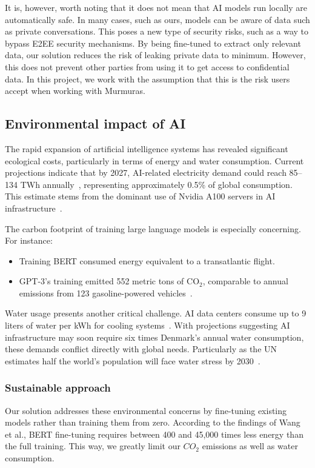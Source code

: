 \documentclass[licencjacka,en]{pracamgr}
\begin{document}
It is, however, worth noting that it does not mean that AI models run locally are automatically safe. In many cases, such as ours, models can be aware of data such as private conversations. This poses a new type of security risks, such as a way to bypass E2EE security mechanisms\cite{E2EE}. By being fine-tuned to extract only relevant data, our solution reduces the risk of leaking private data to minimum. However, this does not prevent other parties from using it to get access to confidential data. In this project, we work with the assumption that this is the risk users accept when working with Murmuras.

\subsection{Environmental impact of AI}
The rapid expansion of artificial intelligence systems has revealed significant ecological costs, particularly in terms of energy and water consumption. Current projections indicate that by 2027, AI-related electricity demand could reach 85--134 TWh annually~\cite{this_study}, representing approximately 0.5\% of global consumption. This estimate stems from the dominant use of Nvidia A100 servers in AI infrastructure~\cite{nyt_el}.

The carbon footprint of training large language models is especially concerning. For instance:
\begin{itemize}
    \item Training BERT consumed energy equivalent to a transatlantic flight.
    \item GPT-3's training emitted 552 metric tons of CO$_2$, comparable to annual emissions from 123 gasoline-powered vehicles~\cite{sci_am_co2}.
\end{itemize}

Water usage presents another critical challenge. AI data centers consume up to 9 liters of water per kWh for cooling systems~\cite{first}. With projections suggesting AI infrastructure may soon require six times Denmark's annual water consumption, these demands conflict directly with global needs. Particularly as the UN estimates half the world's population will face water stress by 2030~\cite{water_scarcity}.

\subsubsection{Sustainable approach}
Our solution addresses these environmental concerns by fine-tuning existing models rather than training them from zero. According to the findings of Wang et al., BERT fine-tuning requires between 400 and 45,000 times less energy than the full training. This way, we greatly limit our $CO_2$ emissions as well as water consumption.
\end{document}
